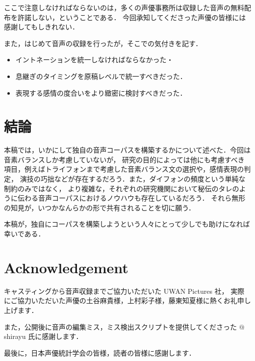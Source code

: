 \documentclass[final,10pt,twocolumn,3p,times,fleqn]{elsarticle}
\begin{document}
  ここで注意しなければならないのは，多くの声優事務所は収録した音声の無料配布を許諾しない，ということである．
  今回承知してくださった声優の皆様には感謝してもしきれない．

  また，はじめて音声の収録を行ったが，そこでの気付きを記す．

  \begin{itemize}
   \item イントネーションを統一しなければならなかった・	 
   \item 息継ぎのタイミングを原稿レベルで統一すべきだった．
   \item 表現する感情の度合いをより緻密に検討すべきだった．
  \end{itemize}

  \section{結論}
  本稿では，いかにして独自の音声コーパスを構築するかについて述べた．今回は音素バランスしか考慮していないが，
  研究の目的によっては他にも考慮すべき項目，例えばトライフォンまで考慮した音素バランス文の選択や，感情表現の判定，
  演技の巧拙などが存在するだろう．また，ダイフォンの頻度という単純な制約のみではなく，
  より複雑な，それぞれの研究機関において秘伝のタレのように伝わる音声コーパスにおけるノウハウも存在しているだろう．
  それら無形の知見が，いつかなんらかの形で共有されることを切に願う．

  本稿が，独自にコーパスを構築しようという人々にとって少しでも助けになれば幸いである．

  \section*{Acknowledgement}
  キャスティングから音声収録までご協力いただいた UWAN Pictures 社，
  実際にご協力いただいた声優の土谷麻貴様，上村彩子様，藤東知夏様に熱くお礼申し上げます．

  また，公開後に音声の編集ミス，ミス検出スクリプトを提供してくださった $@$shirayu 氏に感謝します．

  最後に，日本声優統計学会の皆様，読者の皆様に感謝します．
  
 
 
\end{document}

